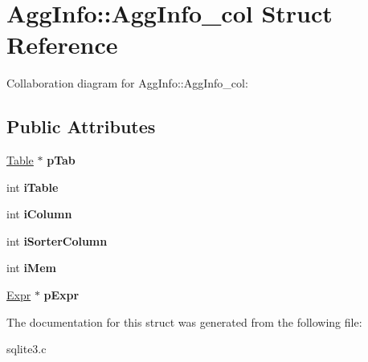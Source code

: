 \hypertarget{structAggInfo_1_1AggInfo__col}{}\section{Agg\+Info\+:\+:Agg\+Info\+\_\+col Struct Reference}
\label{structAggInfo_1_1AggInfo__col}


Collaboration diagram for Agg\+Info\+:\+:Agg\+Info\+\_\+col\+:
\subsection*{Public Attributes}
\begin{DoxyCompactItemize}
\item 
\hyperlink{structTable}{Table} $\ast$ {\bfseries p\+Tab}\hypertarget{structAggInfo_1_1AggInfo__col_ad2f2ae137b49e72d28a57accc9d06386}{}\label{structAggInfo_1_1AggInfo__col_ad2f2ae137b49e72d28a57accc9d06386}

\item 
int {\bfseries i\+Table}\hypertarget{structAggInfo_1_1AggInfo__col_ab49aa2fbfc6278c86b64497a6807c113}{}\label{structAggInfo_1_1AggInfo__col_ab49aa2fbfc6278c86b64497a6807c113}

\item 
int {\bfseries i\+Column}\hypertarget{structAggInfo_1_1AggInfo__col_a4cad2ce99ddf7425d358d49e40524f6b}{}\label{structAggInfo_1_1AggInfo__col_a4cad2ce99ddf7425d358d49e40524f6b}

\item 
int {\bfseries i\+Sorter\+Column}\hypertarget{structAggInfo_1_1AggInfo__col_ae3901ad0d5b6d519a7559358f1f7248b}{}\label{structAggInfo_1_1AggInfo__col_ae3901ad0d5b6d519a7559358f1f7248b}

\item 
int {\bfseries i\+Mem}\hypertarget{structAggInfo_1_1AggInfo__col_ae22f3dfc6f9c2dc647be1b9fbd14e896}{}\label{structAggInfo_1_1AggInfo__col_ae22f3dfc6f9c2dc647be1b9fbd14e896}

\item 
\hyperlink{structExpr}{Expr} $\ast$ {\bfseries p\+Expr}\hypertarget{structAggInfo_1_1AggInfo__col_a60f23ec0abfcc88cab7083967a3abd9e}{}\label{structAggInfo_1_1AggInfo__col_a60f23ec0abfcc88cab7083967a3abd9e}

\end{DoxyCompactItemize}


The documentation for this struct was generated from the following file\+:\begin{DoxyCompactItemize}
\item 
sqlite3.\+c\end{DoxyCompactItemize}
